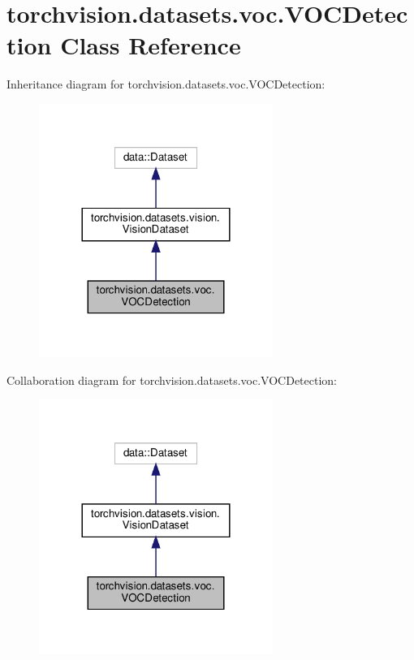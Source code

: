 \hypertarget{classtorchvision_1_1datasets_1_1voc_1_1VOCDetection}{}\section{torchvision.\+datasets.\+voc.\+V\+O\+C\+Detection Class Reference}
\label{classtorchvision_1_1datasets_1_1voc_1_1VOCDetection}


Inheritance diagram for torchvision.\+datasets.\+voc.\+V\+O\+C\+Detection\+:
\nopagebreak
\begin{figure}[H]
\begin{center}
\leavevmode
\includegraphics[width=216pt]{classtorchvision_1_1datasets_1_1voc_1_1VOCDetection__inherit__graph}
\end{center}
\end{figure}


Collaboration diagram for torchvision.\+datasets.\+voc.\+V\+O\+C\+Detection\+:
\nopagebreak
\begin{figure}[H]
\begin{center}
\leavevmode
\includegraphics[width=216pt]{classtorchvision_1_1datasets_1_1voc_1_1VOCDetection__coll__graph}
\end{center}
\end{figure}
